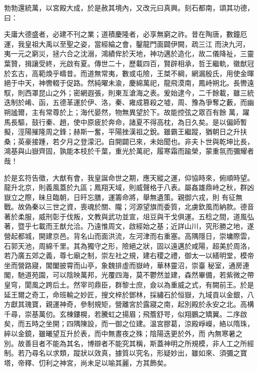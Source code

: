 \begin{pinyinscope}
 勃勃還統萬，以宮殿大成，於是赦其境內，又改元曰真興。刻石都南，頌其功德，曰：



 夫庸大德盛者，必建不刊之業；道積慶隆者，必享無窮之祚。昔在陶唐，數鐘厄運，我皇祖大禹以至聖之姿，當經綸之會，鑿龍門面闢伊闕，疏三江
 而決九河，夷一元之窮災，拯六合之沈溺，鴻績侔於天地，神功邁於造化，故二儀降祉，三靈葉贊，揖讓受終，光啟有夏。傳世二十，歷載四百，賢辟相承，哲王繼軌，徽猷冠於玄古，高範煥乎疇昔。而道無常夷，數或屯險，王桀不綱，網漏殷氏，用使金暉絕于中天，神轡輟于促路。然純曜未渝，慶綿萬祀，龍飛漠南，鳳峙朔北。長轡遠馭，則西罩昆山之外；密網遐張，則東亙滄海之表。爰始逮今，二千餘載，雖三統迭制於崤、函，五德革運於伊、洛，秦、雍成篡殺之墟，周、豫為爭奪之藪，而幽朔謐爾，主有常尊於上；海代晏然，物無異望於下。故能控弦之眾百有餘
 萬，躍馬長驅，鼓行秦、趙，使中原疲於奔命，諸夏不得高枕，為日久矣。是以偏師暫擬，涇陽摧隆周之鋒；赫斯一奮，平陽挫漢祖之銳。雖霸王繼蹤，猶朝日之升扶桑；英豪接踵，若夕月之登濛汜。自開闢已來，未始聞也。非夫卜世與乾坤比長，鴻基與山嶽齊固，孰能本枝於千葉，重光於萬祀，履寒霜而踰榮，蒙重氛而彌耀者哉！



 於是玄符告徵，大猷有會，我皇誕命世之期，應天縱之運，仰協時來，俯順時望。龍升北京，則義風蓋於九區；鳳翔天域，則威聲格于八表。屬姦雄鼎峙之秋，群凶嶽立之際，昧旦臨朝，日旰忘膳，運籌命將，舉無遺策。親御六戎，則
 有征無戰。故偽秦以三世之資，喪魂於關、隴；河源望旗而委質，北虜欽風而納款。德音著於柔服，威刑彰于伐叛，文教與武功並宣，俎豆與干戈俱運。五稔之間，道風弘著，暨乎七載而王猷允洽。乃遠惟周文，啟經始之基；近詳山川，究形勝之地，遂營起都城，開建京邑。背名山而面洪流，左河津而右重塞。高隅隱日，崇墉際雲，石郭天池，周綿千里。其為獨守之形，險絕之狀，固以遠邁於咸陽，超美於周洛，若乃廣五郊之義，尊七廟之制，崇左社之規，建右稷之禮，御太一以繕明堂，模帝坐而營路寢，閶闔披霄而山亭，象魏排虛而嶽峙，華林靈沼，崇臺
 秘室，通房連閣，馳道苑園，可以陰映萬邦，光覆四海，莫不鬱然並建，森然畢備，若紫微之帶皇穹，閬風之跨后土。然宰司鼎臣，群黎士庶，僉以為重威之式，有闕前王。於是延王爾之奇工，命班輸之妙匠，搜文梓於鄧林，採繡石於恒嶽，九域貢以金銀，八方獻其瑰寶，親運神奇，參制規矩，營離宮於露寢之南，起別殿於永安之北。高構千尋，崇基萬仞。玄棟鏤榥，若騰虹之揚眉；飛簷舒咢，似翔鵬之矯翼。二序啟矣，而五時之坐開；四隅陳設，而一御之位建。溫宮膠葛，涼殿崢嶸，絡以隋珠，綷以金鏡，雖曦望互升於表，而中無晝夜之殊；陰陽迭更於外，而
 內無寒暑之別。故善目者不能為其名，博辯者不能究其稱，斯蓋神明之所規模，非人工之所經制。若乃尋名以求類，蹤狀以效真，據質以究名，形疑妙出，雖如來、須彌之寶塔，帝釋、忉利之神宮，尚未足以喻其麗，方其飾矣。




\end{pinyinscope}
